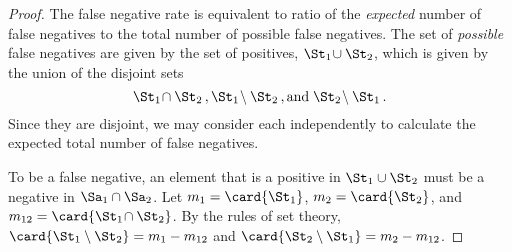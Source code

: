 \documentclass[ ../main.tex]{subfiles}
\begin{document}
\begin{proof}
The false negative rate is equivalent to ratio of the \emph{expected} number of false negatives to the total number of possible false negatives. The set of \emph{possible} false negatives are given by the set of positives, $\St_1 \! \cup \St_2$, which is given by the union of the disjoint sets
\begin{equation}
    \St_1 \! \cap \St_2\,,
    \St_1 \! \setminus \St_2\,,\text{and}\;
    \St_2 \! \setminus \St_1\,.
\end{equation}
Since they are disjoint, we may consider each independently to calculate the expected total number of false negatives.

To be a false negative, an element that is a positive in $\St_1 \cup \St_2$ must be a negative in $\Sa_1 \cap \Sa_2$. Let $m_1 = \card{\St_1}$, $m_2 = \card{\St_2}$, and $m_{1 2} = \card{\St_1 \!\cap \St_2}$. By the rules of set theory, $\card{\St_1 \setminus \St_2} = m_1 - m_{1 2}$ and $\card{\St_2 \setminus \St_1} = m_2 - m_{1 2}$.


\end{proof}
\end{document}
